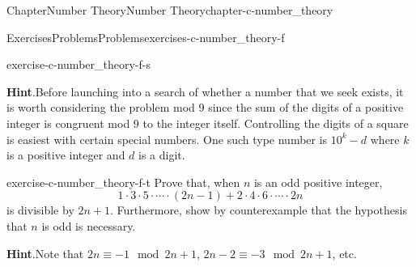 \documentclass[oneside,10pt,]{book}
\newcommand{\blocktitlefont}{\relax}
\numberwithin{equation}{section}
\begin{document}
\begin{chapterptx}{Chapter}{Number Theory}{}{Number Theory}{}{}{chapter-c-number_theory}
\begin{exercises-section}{Exercises}{Problems}{}{Problems}{}{}{exercises-c-number_theory-f}
\begin{divisionexercise}{17}{}{}{exercise-c-number_theory-f-s}
\par\smallskip%
\noindent\textbf{\blocktitlefont Hint}.\hypertarget{hint-c-number_theory-f-s-b}{}\quad{}Before launching into a search of whether a number that we seek exists, it is worth considering the problem mod 9 since the sum of the digits of a positive integer is congruent mod 9 to the integer itself.   Controlling the digits of a square is easiest with certain special numbers.   One such type number is \(10^k-d\) where \(k\) is a positive integer and \(d\) is a digit.%
\end{divisionexercise}%
\begin{divisionexercise}{18}{}{}{exercise-c-number_theory-f-t}%
Prove that, when \(n\) is an odd positive integer,%
\begin{equation*}
1\cdot 3\cdot 5\cdot \cdots \cdot (2n-1) + 2\cdot 4\cdot 6\cdot \cdots \cdot  2n
\end{equation*}
is divisible by \(2n + 1\). Furthermore, show by counterexample that the hypothesis that \(n\) is odd is necessary.%
\par\smallskip%
\noindent\textbf{\blocktitlefont Hint}.\hypertarget{hint-c-number_theory-f-t-b}{}\quad{}Note that \(2n \equiv -1 \mod{2n+1}\), \(2n-2 \equiv  -3 \mod{2n+1}\), etc.%
\end{divisionexercise}%
\end{exercises-section}
\end{chapterptx}
%
%
\typeout{************************************************}
\typeout{************************************************}
%
\end{document}

